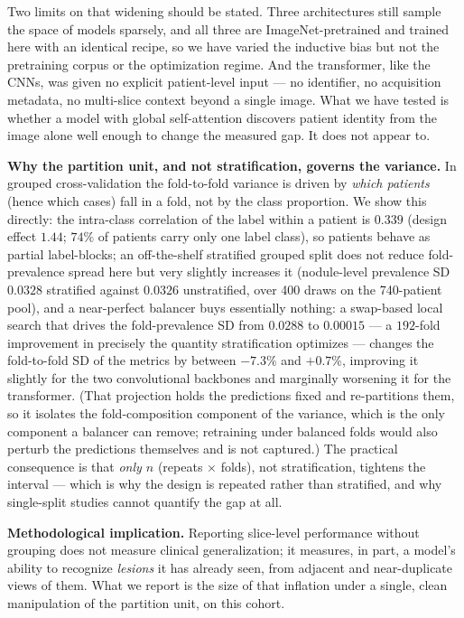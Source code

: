 \documentclass{ieeeaccess}
\begin{document}
Two limits on that widening should be stated. Three architectures still sample the space of models
sparsely, and all three are ImageNet-pretrained and trained here with an identical recipe, so we
have varied the inductive bias but not the pretraining corpus or the optimization regime. And the
transformer, like the CNNs, was given no explicit patient-level input --- no identifier, no
acquisition metadata, no multi-slice context beyond a single image. What we have tested is whether
a model with global self-attention discovers patient identity from the image alone well enough to
change the measured gap. It does not appear to.

\textbf{Why the partition unit, and not stratification, governs the variance.} In grouped
cross-validation the fold-to-fold variance is driven by \emph{which patients} (hence which cases)
fall in a fold, not by the class proportion. We show this directly: the intra-class correlation of
the label within a patient is $0.339$ (design effect $1.44$; $74\%$ of patients carry only one label
class), so patients behave as partial label-blocks; an off-the-shelf stratified grouped split does
not reduce fold-prevalence spread here but very slightly increases it (nodule-level prevalence SD
$0.0328$ stratified against $0.0326$ unstratified, over 400 draws on the 740-patient pool), and a
near-perfect balancer buys essentially nothing: a swap-based
local search that drives the fold-prevalence SD from $0.0288$ to $0.00015$ --- a $192$-fold
improvement in precisely the quantity stratification optimizes --- changes the fold-to-fold SD of the
metrics by between $-7.3\%$ and $+0.7\%$, improving it slightly for the two convolutional backbones
and marginally worsening it for the transformer. (That projection holds the predictions fixed and re-partitions
them, so it isolates the fold-composition component of the variance, which is the only component a
balancer can remove; retraining under balanced folds would also perturb the predictions themselves
and is not captured.) The practical consequence is that
\emph{only $n$} (repeats $\times$ folds), not stratification, tightens the interval --- which is
why the design is repeated rather than stratified, and why single-split studies cannot quantify the
gap at all.

\textbf{Methodological implication.} Reporting slice-level performance without grouping does not
measure clinical generalization; it measures, in part, a model's ability to recognize \emph{lesions}
it has already seen, from adjacent and near-duplicate views of them. What we report is the size of
that inflation under a single, clean manipulation of the partition unit, on this cohort.
\end{document}
